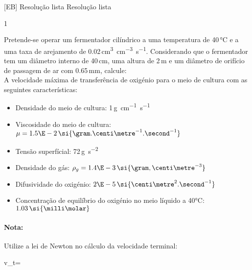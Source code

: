 \documentclass[\mainfilename]{subfiles}
\begin{document}

[EB]
{Resolução lista} %
{Resolução lista} %

\begin{questionBox}1{ %
    Pretende-se operar um fermentador cilíndrico a uma temperatura de 40\,\si{\celsius} e a uma taxa de arejamento de 0.02\,\si{\centi\metre^3.\centi\metre^{-3}.\second^{-1}}. Considerando que o fermentador tem um diâmetro interno de 40\,\si{\centi\metre}, uma altura de 2\,\si{\metre} e um diâmetro de orifício de passagem de ar com 0.65\,\si{\milli\metre}, calcule:\\
    A velocidade máxima de transferência de oxigénio para o meio de cultura com as seguintes características:
    \begin{itemize}
        \item Densidade do meio de cultura: 1\,\si{\gram.\centi\metre^{-1}.\second^{-1}}
        \item Viscosidade do meio de cultura: \(\mu=1.5\E-2\,\si{\gram.\centi\metre^{-1}.\second^{-1}}\)
        \item Tensão superfícial: 72\,\si{\gram.\second^{-2}}
        \item Densidade do gás: \(\rho_g=1.4\E-3\,\si{\gram,\centi\metre^{-3}}\)
        \item Difusividade do oxigénio: \(2\E-5\,\si{\centi\metre^2.\second^{-1}}\)
        \item Concentração de equilíbrio do oxigénio no meio líquido a 40\si{\celsius}: \(1.03\,\si{\milli\molar}\)
    \end{itemize}
} %
    \paragraph*{Nota:}Utilize a lei de Newton no cálculo da velocidade terminal:
    \begin{BM}
        v_t=
    \end{BM}
\end{questionBox}
\end{document}
